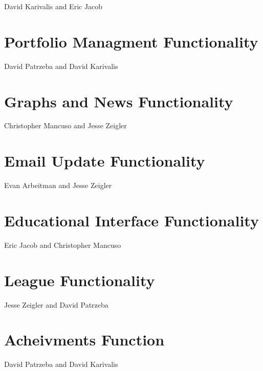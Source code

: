 \documentclass[11pt,letterpaper,oneside]{memoir}
\begin{document}
David Karivalis and Eric Jacob

\section{Portfolio Managment Functionality}

David Patrzeba and David Karivalis

\section{Graphs and News Functionality}

Christopher Mancuso and Jesse Zeigler

\section{Email Update Functionality}

Evan Arbeitman and Jesse Zeigler

\section{Educational Interface Functionality}

Eric Jacob and Christopher Mancuso

\section{League Functionality}

Jesse Zeigler and David Patrzeba

\section{Acheivments Function}

David Patrzeba and David Karivalis
\end{document}
